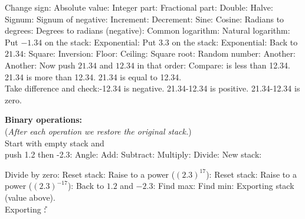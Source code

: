 \medskip
\noindent
Change sign:\Rchs\y
    \Rpop\X{}%
Absolute value:\Rabs\y
    \Rpop\X{}%
Integer part:\Rint\y
    \Rpop\X{}%
Fractional part:\Rfrac\y
    \Rpop\X{}%
Double:\Rdbl\y
    \Rpop\X{}%
Halve:\Rhalve\y
    \Rpop\X{}%
Signum:\Rsgn\y
    \Rpop\X{}%
Signum of negative:\Rsgn\y
    \Rpop\X{}%
Increment:\Rincr\y
    \Rpop\X{}%
Decrement:\Rdecr\y
    \Rpop\X{}%
Sine:\Rsin\y
    \Rpop\X{}%
Cosine:\Rcos\y
    \Rpop\X{}%
Radians to degrees:\Rdeg\y
    \Rpop\X{}%
Degrees to radians (negative):\Rrad\y
    \Rpop\X{}%
Common logarithm:\Rlog\y
    \Rpop\X{}%
Natural logarithm:\Rln\y
Put $-1.34$ on the stack:\Rpop\X{}\y
Exponential:\Rexp\y
Put $3.3$ on the stack:\Rpop\X{}\y
Exponential:\Rexp\y
Back to $21.34$:\Rpop\X{}\y
Square:\Rsq\y
    \Rpop\X{}%
Inversion:\Rinv\y
    \Rpop\X{}%
Floor:\Rfloor\y
    \Rpop\X{}%
Ceiling:\Rceil\y
    \Rpop\X{}%
Square root:\Rsqrt\y
    \Rpop\X{}%
Random number:\Rrand\y
    \Rpop\X{}%
\MFPrandgenB
Another:\Rrand\y
    \Rpop\X{}%
\MFPrandgenC
Another:\Rrand\y
Now push $21.34$ and $12.34$ in that order:\Rpop\X{}\y
Compare:  is less than 12.34.
    21.34 is more than 12.34.
    21.34 is equal to  12.34.\\
Take difference and check:\Rsub\Rchk{}-12.34 is negative.
    21.34-12.34 is positive.
    21.34-12.34 is zero.

\Rpop\X

\filbreak
{\bf Binary operations:}\\
({\it After each operation we restore the original stack.})\\
Start with empty stack and\\
push 1.2 then -2.3:\y
Angle:\Rangle\y\Rpop\X{}%
Add:\Radd\y\Rpop\X{}%
Subtract:\Rsub\y\Rpop\X{}%
Multiply:\Rmul\y\Rpop\X{}%
Divide:\Rdiv\y
New stack:\Rpop\X{}\y
\immediate{}
Divide by zero:\Rdiv\y
Reset stack:\Rpop\X{}\y
Raise to a power ($(2.3)^{17}$):\Rpow\y
Reset stack:\Rpop\X{}\y
Raise to a power ($(2.3)^{-17}$):\Rpow\y
Back to $1.2$ and $-2.3$:\Rpop\X{}\y
Find max:\Rmax\y
    \Rpop\X{}%
Find min:\Rmin\y
Exporting stack (value above).\\
Exporting \verbprint\U: \verbprint\X
\ExportStack
\Export\X
\def\X{0}
\stopMFPprogram

